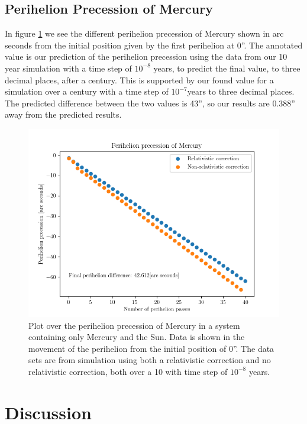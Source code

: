 \documentclass[%
reprint,
nofootinbib,
amsmath,amssymb,
aps,
]{revtex4-1}
\begin{document}
\subsection{Perihelion Precession of Mercury}%
In figure \ref{fig:PP} we see the different perihelion precession of Mercury shown in arc seconds from the initial position given by the first perihelion at 0''. The annotated value is our prediction of the perihelion precession using the data from our 10 year simulation with a time step of $10^{-8}$ years, to predict the final value, to three decimal places, after a century. This is supported by our found value for a simulation over a century with a time step of $10^{-7}$years to three decimal places. The predicted difference between the two values is 43'', so our results are 0.388'' away from the predicted results. 
\begin{figure}[]
	\centering
	\includegraphics[width=0.9\linewidth]{../code/classes/figure/PP.png}
	\caption{Plot over the perihelion precession of Mercury in a system containing only Mercury and the Sun. Data is shown in the movement of the perihelion from the initial position of 0''. The data sets are from simulation using both a relativistic correction and no relativistic correction, both over a 10 with time step of $10^{-8}$ years.}
	\label{fig:PP}
\end{figure}


\section{Discussion} %
\end{document}
